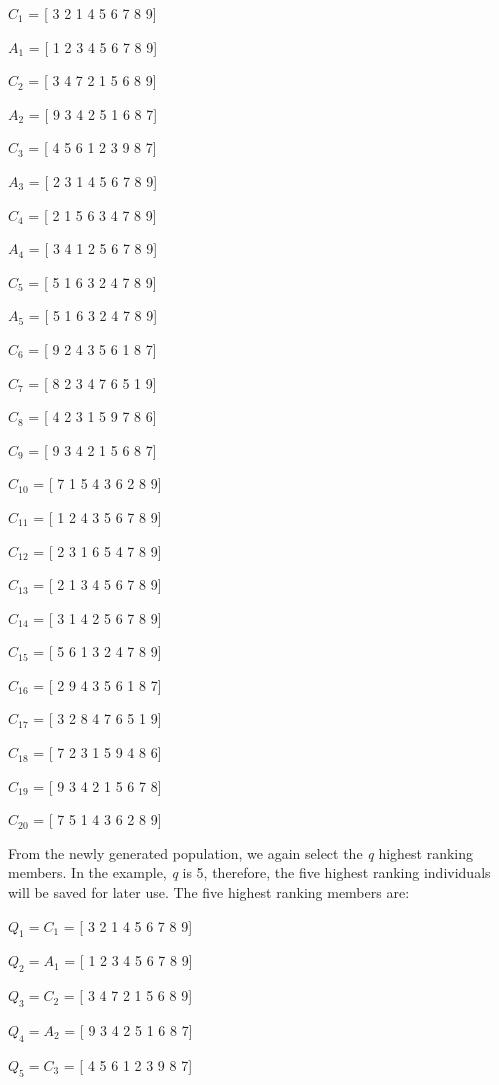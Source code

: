 $C_{1}$ = [ 3 2 1 4 5 6 7 8 9] \par 
$A_{1}$ = [ 1 2 3 4 5 6 7 8 9] \par 
$C_{2}$ = [ 3 4 7 2 1 5 6 8 9] \par 
$A_{2}$ = [ 9 3 4 2 5 1 6 8 7] \par 
$C_{3}$ = [ 4 5 6 1 2 3 9 8 7] \par 
$A_{3}$ = [ 2 3 1 4 5 6 7 8 9] \par 
$C_{4}$ = [ 2 1 5 6 3 4 7 8 9] \par
$A_{4}$ = [ 3 4 1 2 5 6 7 8 9] \par 
$C_{5}$ = [ 5 1 6 3 2 4 7 8 9] \par 
$A_{5}$ = [ 5 1 6 3 2 4 7 8 9] \par 
$C_{6}$ = [ 9 2 4 3 5 6 1 8 7] \par 
$C_{7}$ = [ 8 2 3 4 7 6 5 1 9] \par 
$C_{8}$ = [ 4 2 3 1 5 9 7 8 6] \par 
$C_{9}$ = [ 9 3 4 2 1 5 6 8 7] \par
$C_{10}$ = [ 7 1 5 4 3 6 2 8 9] \par 
$C_{11}$ = [ 1 2 4 3 5 6 7 8 9] \par 
$C_{12}$ = [ 2 3 1 6 5 4 7 8 9] \par 
$C_{13}$ = [ 2 1 3 4 5 6 7 8 9] \par 
$C_{14}$ = [ 3 1 4 2 5 6 7 8 9] \par 
$C_{15}$ = [ 5 6 1 3 2 4 7 8 9] \par 
$C_{16}$ = [ 2 9 4 3 5 6 1 8 7] \par 
$C_{17}$ = [ 3 2 8 4 7 6 5 1 9] \par 
$C_{18}$ = [ 7 2 3 1 5 9 4 8 6] \par 
$C_{19}$ = [ 9 3 4 2 1 5 6 7 8] \par
$C_{20}$ = [ 7 5 1 4 3 6 2 8 9] \par 

From the newly generated population, we again select the  \emph{q} highest ranking members. In the example, \emph{ q} is 5, therefore, the five highest ranking individuals will be saved for later use. The five highest ranking members are: \par 
$Q_1 = C_{1}$ = [ 3 2 1 4 5 6 7 8 9] \par 
$Q_2 = A_{1}$ = [ 1 2 3 4 5 6 7 8 9] \par 
$Q_3 = C_{2}$ = [ 3 4 7 2 1 5 6 8 9] \par 
$Q_4 = A_{2}$ = [ 9 3 4 2 5 1 6 8 7] \par 
$Q_5 = C_{3}$ = [ 4 5 6 1 2 3 9 8 7] \par 

